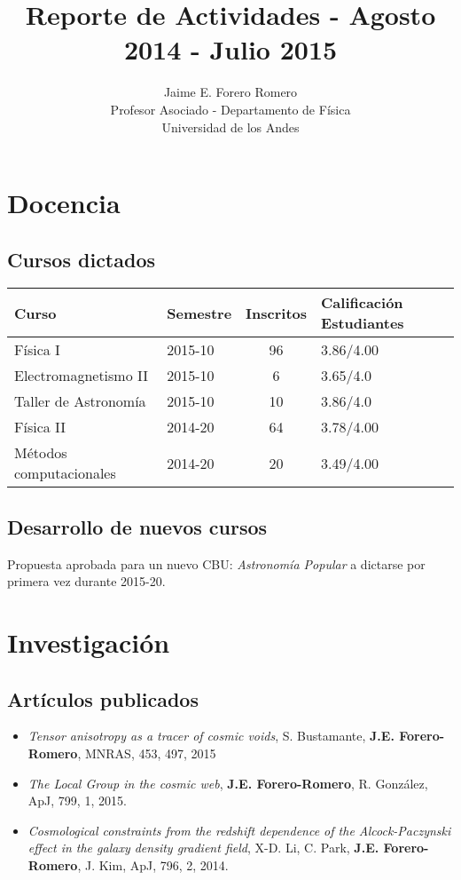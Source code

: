 \documentclass{article}
\title{Reporte de Actividades - Agosto 2014 - Julio 2015}
\author{Jaime E. Forero Romero\\Profesor Asociado - Departamento de
  F\'isica\\Universidad de los Andes}
\begin{document}
\maketitle
\tableofcontents
\newpage

\section{Docencia}

\subsection{Cursos dictados}
\begin{tabular}{p{6.0cm} l c p{2cm}}\hline
Curso & Semestre & Inscritos & Calificaci\'on Estudiantes\\\hline
F\'isica I & 2015-10 & 96 & 3.86/4.00 \\
Electromagnetismo II & 2015-10 & 6 & 3.65/4.0 \\
Taller de Astronom\'ia & 2015-10 & 10 & 3.86/4.0\\
F\'isica II & 2014-20 & 64 & 3.78/4.00\\
M\'etodos computacionales & 2014-20 & 20 & 3.49/4.00\\\hline
\end{tabular}

\subsection{Desarrollo de nuevos cursos}
Propuesta aprobada para un nuevo CBU: \emph{Astronom\'ia Popular} a
dictarse por primera vez durante 2015-20.


\section{Investigaci\'on}

\subsection{Art\'iculos publicados}

\begin{itemize}
\item{\it Tensor anisotropy as a tracer of cosmic voids},
  S. Bustamante, {\bf   J.E. Forero-Romero}, MNRAS, 453,
  497, 2015
\item{\it The Local Group in the cosmic web}, {\bf
  J.E. Forero-Romero}, R. Gonz\'alez, ApJ, 799, 1, 2015.
\item{\it Cosmological constraints from the redshift dependence of
  the Alcock-Paczynski effect in the galaxy density gradient field},
  X-D. Li, C. Park, {\bf J.E. Forero-Romero}, J. Kim, ApJ, 796, 2,
  2014.
\end{itemize}
\end{document}
